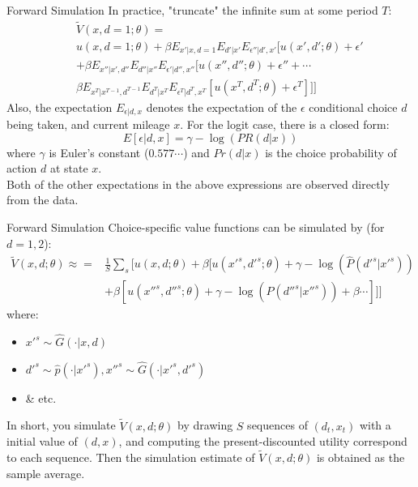 \documentclass[xcolor=pdftex,dvipsnames,table,mathserif]{beamer}
\begin{document}
\begin{frame}{Forward Simulation}
In practice, "truncate" the infinite sum at some period $T$: 
\begin{eqnarray*} 
&& \tilde V(x, d=1;\theta) =\\
&& u(x, d=1; \theta) + \beta E_{x'|x, d=1} E_{d'|x'} E_{\epsilon''|d', x'} [u(x', d';\theta) + \epsilon' \\
&& + \beta E_{x''|x', d''} E_{d''|x''} E_{\epsilon'|d'', x''} [u(x'', d'';\theta) + \epsilon'' + \cdots \\
&& \beta E_{x^T|x^{T-1}, d^{T-1}} E_{d^T|x^T} E_{\epsilon^T|d^T, x^T} [u(x^T, d^T;\theta) + \epsilon^T ]]]
\end{eqnarray*}
Also, the expectation $E_{\epsilon|d, x}$ denotes the expectation of the $\epsilon$ conditional choice $d$ being taken, and current mileage $x$. For the logit case, there is a closed form:
$$ E[\epsilon | d, x] = \gamma - \log(PR(d|x))$$
where $\gamma$ is Euler's constant ($0.577\cdots$) and $Pr(d|x)$ is the choice probability of action $d$ at state $x$. \\
\vspace{2mm}
Both of the other expectations in the above expressions are observed directly from the data. 
\end{frame}

\begin{frame}{Forward Simulation}
Choice-specific value functions can be simulated by (for $d=1,2$): 
\begin{eqnarray*}
\tilde V (x, d; \theta) \approx = & \frac 1 S \sum_s [ u(x, d;\theta) + \beta [ u(x'^s, d'^s;\theta) + \gamma - \log(\hat P(d'^s|x'^s)) \\
& +\beta [ u(x''^s, d''^s;\theta) + \gamma - \log (\hat P (d''^s |x''^s)) + \beta \cdots ]]]
\end{eqnarray*}
where:
\begin{itemize}
\item $x'^s \sim \hat G(\cdot | x, d)$ 
\item $d'^s \sim \hat p(\cdot | x'^s), x''^s \sim \hat G(\cdot | x'^s, d'^s)$ 
\item \& etc. 
\end{itemize}
In short, you simulate $\tilde V (x, d;\theta)$ by drawing $S$ \alert{sequences} of $(d_t, x_t)$ with a initial value of $(d, x)$, and computing the present-discounted utility correspond to each sequence. Then the simulation estimate of $\tilde V (x, d;\theta)$ is obtained as the sample average. 
\end{frame}
\end{document}
